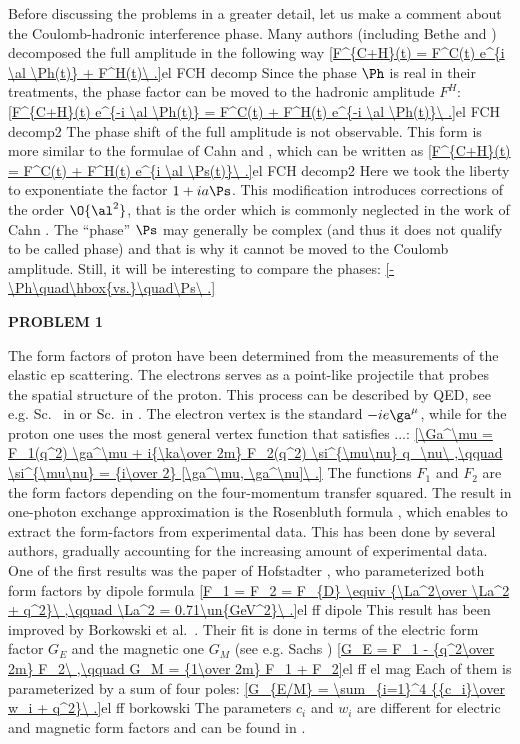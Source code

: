 Before discussing the problems in a greater detail, let us make a comment about the Coulomb-hadronic interference phase. Many authors (including Bethe  and \WY{} ) decomposed the full amplitude in the following way
\eqref{F^{C+H}(t) = F^C(t) e^{i \al \Ph(t)} + F^H(t)\ .}{el FCH decomp}
Since the phase $\Ph$ is real in their treatments, the phase factor can be moved to the hadronic amplitude $F^H$:
\eqref{F^{C+H}(t) e^{-i \al \Ph(t)} = F^C(t) + F^H(t) e^{-i \al \Ph(t)}\ .}{el FCH decomp2}
The phase shift of the full amplitude is not observable. This form is more similar to the formulae of Cahn  and \KL{} , which can be written as
\eqref{F^{C+H}(t) = F^C(t) + F^H(t) e^{i \al \Ps(t)}\ .}{el FCH decomp2}
Here we took the liberty to exponentiate the factor $1+ia\Ps$. This modification introduces corrections of the order $\O{\al^2}$, that is the order which is commonly neglected in the work of Cahn . The ``phase'' $\Ps$ may generally be complex (and thus it does not qualify to be called phase) and that is why it cannot be moved to the Coulomb amplitude. Still, it will be interesting to compare the phases:
\eqref{-\Ph\quad\hbox{vs.}\quad\Ps\ .}{}


{\bf PROBLEM 1}

The form factors of proton have been determined from the measurements of the elastic ep scattering. The electrons serves as a point-like projectile that probes the spatial structure of the proton. This process can be described by QED, see e.g. Sc. ~in  or Sc.~in . The electron vertex is the standard $-ie\ga^\mu$, while for the proton one uses the most general vertex function that satisfies ...:
\eqref{\Ga^\mu = F_1(q^2) \ga^\mu + i{\ka\over 2m} F_2(q^2) \si^{\mu\nu} q_\nu\ ,\qquad \si^{\mu\nu} = {i\over 2} [\ga^\mu, \ga^\nu]\ .}{}
The functions $F_1$ and $F_2$ are the form factors depending on the four-momentum transfer squared. The result in one-photon exchange approximation is the Rosenbluth formula , which enables to extract the form-factors from experimental data. This has been done by several authors, gradually accounting for the increasing amount of experimental data. One of the first results was the paper of Hofstadter , who parameterized both form factors by dipole formula
\eqref{F_1 = F_2 = F_{D} \equiv {\La^2\over \La^2 + q^2}\ ,\qquad \La^2 = 0.71\un{GeV^2}\ .}{el ff dipole}
This result has been improved by Borkowski et al.~. Their fit is done in terms of the electric form factor $G_E$ and the magnetic one $G_M$ (see e.g. Sachs )
\eqref{G_E = F_1 - {q^2\over 2m} F_2\ ,\qquad G_M = {1\over 2m} F_1 + F_2}{el ff el mag}
Each of them is parameterized by a sum of four poles:
\eqref{G_{E/M} = \sum_{i=1}^4 {{c_i}\over w_i + q^2}\ .}{el ff borkowski}
The parameters $c_i$ and $w_i$ are different for electric and magnetic form factors and can be found in .

